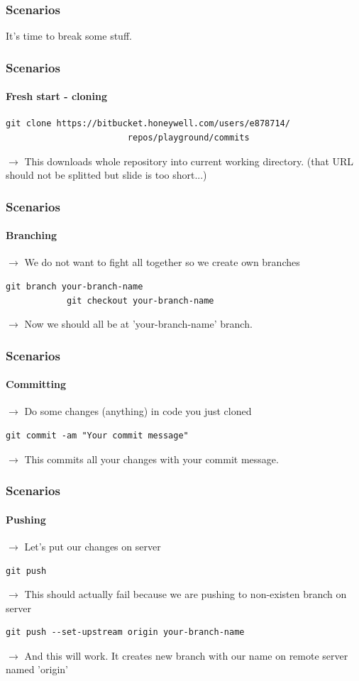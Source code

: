 \documentclass[aspectratio=169]{beamer}
\begin{document}
    \begin{frame}
        \frametitle{Scenarios}
        \huge{It's time to break some stuff. }
    \end{frame}
    \begin{frame}[fragile]
        \frametitle{Scenarios}
        \framesubtitle{Fresh start - cloning}
        \begin{lstlisting}[gobble=12]
            git clone https://bitbucket.honeywell.com/users/e878714/
                        repos/playground/commits
        \end{lstlisting}
        $\rightarrow$ This downloads whole repository into current working directory. (that URL should not be splitted but slide is too short...)
    \end{frame}
    \begin{frame}[fragile]
        \frametitle{Scenarios}
        \framesubtitle{Branching}
        $\rightarrow$ We do not want to fight all together so we create own branches
        \begin{lstlisting}[gobble=12]
            git branch your-branch-name
            git checkout your-branch-name
        \end{lstlisting}
        $\rightarrow$ Now we should all be at 'your-branch-name' branch.
    \end{frame}
    \begin{frame}[fragile]
        \frametitle{Scenarios}
        \framesubtitle{Committing}
        $\rightarrow$ Do some changes (anything) in code you just cloned
        \begin{lstlisting}[gobble=12]
            git commit -am "Your commit message"
        \end{lstlisting}
        $\rightarrow$ This commits all your changes with your commit message.
    \end{frame}
    \begin{frame}[fragile]
        \frametitle{Scenarios}
        \framesubtitle{Pushing}
        $\rightarrow$ Let's put our changes on server
        \begin{lstlisting}[gobble=12]
            git push
        \end{lstlisting}
        $\rightarrow$ This should actually fail because we are pushing to non-existen branch on server
        \begin{lstlisting}[gobble=12]
            git push --set-upstream origin your-branch-name
        \end{lstlisting}
        $\rightarrow$ And this will work. It creates new branch with our name on remote server named 'origin'
    \end{frame}
\end{document}
